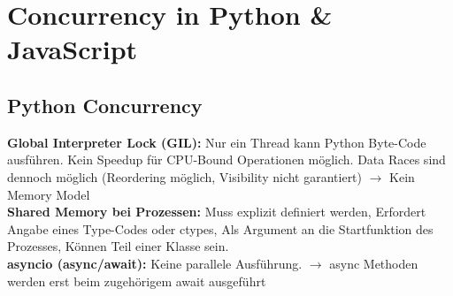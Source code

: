 
\section{Concurrency in Python \& JavaScript}
\subsection{Python Concurrency}
\textcolor{b}{\textbf{Global Interpreter Lock (GIL):}} Nur ein Thread kann Python Byte-Code ausführen. Kein Speedup für CPU-Bound Operationen möglich. Data Races sind dennoch möglich (Reordering möglich, Visibility nicht garantiert) $\rightarrow$ Kein Memory Model\\
\textcolor{b}{\textbf{Shared Memory bei Prozessen:}} Muss explizit definiert werden, Erfordert Angabe eines Type-Codes oder ctypes, Als Argument an die Startfunktion des Prozesses, Können Teil einer Klasse sein.\\
\textcolor{b}{\textbf{asyncio (async/await):}} Keine parallele Ausführung. $\rightarrow$ async Methoden werden erst beim zugehörigem await ausgeführt